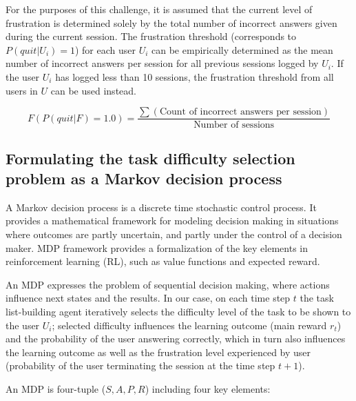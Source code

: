 For the purposes of this challenge, it is assumed that the current level of frustration is determined solely by the total number of incorrect answers given during the current session.
The frustration threshold (corresponds to $P(quit|U_i)=1$) for each user $U_i$ can be empirically determined as the mean number of incorrect answers per session for all previous sessions logged by $U_i$.
If the user $U_i$ has logged less than 10 sessions, the frustration threshold from all users in $U$ can be used instead.

\begin{equation} \label{eq:frustration_threshold}
    F(P(quit|F) = 1.0) = \frac{\sum \left( \text{Count of incorrect answers per session} \right) } {\text{Number of sessions}}
\end{equation}

\subsection{Formulating the task difficulty selection problem as a Markov decision process} \label{subsec:formulating_mdp}

A Markov decision process is a discrete time stochastic control process.
It provides a mathematical framework for modeling decision making in situations where outcomes are partly uncertain, and partly under the control of a decision maker.
MDP framework provides a formalization of the key elements in reinforcement learning (RL), such as value functions and expected reward.

An MDP expresses the problem of sequential decision making, where actions influence next states and the results.
In our case, on each time step $t$ the task list-building agent iteratively selects the difficulty level of the task to be shown to the user $U_i$;
selected difficulty influences the learning outcome (main reward $r_t$) and the probability of the user answering correctly, which in turn also influences the learning outcome as well as the frustration level experienced by user (probability of the user terminating the session at the time step $t+1$).

An MDP is four-tuple ($S, A, P, R$) including four key elements:


